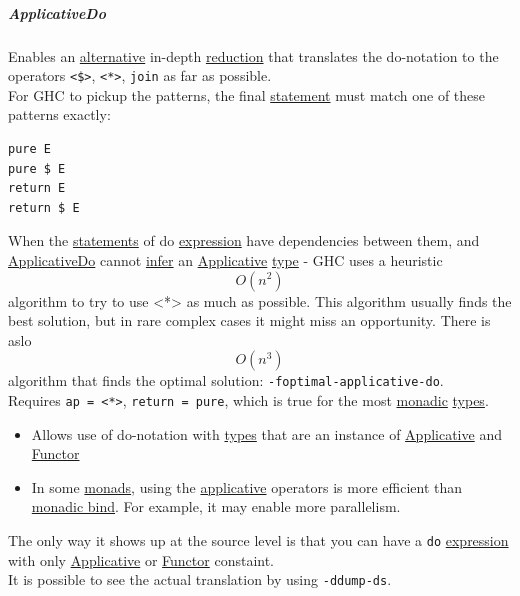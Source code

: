 \documentclass[11pt]{article}
\begin{document}
\subparagraph{\label{org55db24e}ApplicativeDo}
\label{sec:org902fcfb}
Enables an \hyperref[orgabbc1e9]{alternative} in-depth \hyperref[org7bec118]{reduction} that translates the do-notation to the operators \texttt{<\$>}, \texttt{<*>}, \texttt{join} as far as possible.\\

For GHC to pickup the patterns, the final \hyperref[org36313c0]{statement} must match one of these patterns exactly:\\

\begin{verbatim}
pure E
pure $ E
return E
return $ E
\end{verbatim}

When the \hyperref[org0c99cef]{statements} of do \hyperref[org9021dd7]{expression} have dependencies between them, and \hyperref[org55db24e]{ApplicativeDo} cannot \hyperref[org6da926a]{infer} an \hyperref[org2dfdf4a]{Applicative} \hyperref[orgc4aea2f]{type} - GHC uses a heuristic $$ O(n^2) $$ algorithm to try to use <*> as much as possible. This algorithm usually finds the best solution, but in rare complex cases it might miss an opportunity. There is aslo $$ O(n^3) $$ algorithm that finds the optimal solution: \texttt{-foptimal-applicative-do}.\\

Requires \texttt{ap = <*>}, \texttt{return = pure}, which is true for the most \hyperref[orgad51197]{monadic} \hyperref[org4209edd]{types}.\\
\begin{itemize}
\item Allows use of do-notation with \hyperref[org4209edd]{types} that are an instance of \hyperref[org2dfdf4a]{Applicative} and \hyperref[orgf2f6841]{Functor}\\
\item In some \hyperref[org0d4a4ef]{monads}, using the \hyperref[org2dfdf4a]{applicative} operators is more efficient than \hyperref[orge903a56]{monadic bind}. For example, it may enable more parallelism.\\
\end{itemize}

The only way it shows up at the source level is that you can have a \texttt{do} \hyperref[org9021dd7]{expression} with only \hyperref[org2dfdf4a]{Applicative} or \hyperref[orgf2f6841]{Functor} constaint.\\

It is possible to see the actual translation by using \texttt{-ddump-ds}.\\
\end{document}

